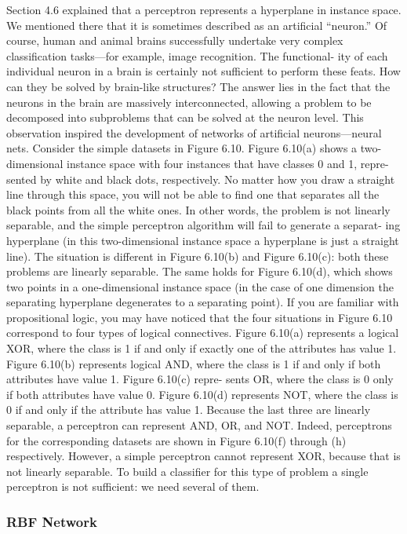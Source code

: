 \documentclass[conference,a4paper]{IEEEtran}
\begin{document}
Section 4.6 explained that a perceptron represents a hyperplane in instance space. We mentioned there that it is sometimes described as an artificial “neuron.” Of course, human and animal brains successfully undertake very complex classification tasks—for example, image recognition. The functional- ity of each individual neuron in a brain is certainly not sufficient to perform these feats. How can they be solved by brain-like structures? The answer lies in the fact that the neurons in the brain are massively interconnected, allowing a problem to be decomposed into subproblems that can be solved at the neuron level. This observation inspired the development of networks of artificial neurons—neural nets.
Consider the simple datasets in Figure 6.10. Figure 6.10(a) shows a two- dimensional instance space with four instances that have classes 0 and 1, repre- sented by white and black dots, respectively. No matter how you draw a straight line through this space, you will not be able to find one that separates all the black points from all the white ones. In other words, the problem is not linearly separable, and the simple perceptron algorithm will fail to generate a separat- ing hyperplane (in this two-dimensional instance space a hyperplane is just a straight line). The situation is different in Figure 6.10(b) and Figure 6.10(c): both these problems are linearly separable. The same holds for Figure 6.10(d), which shows two points in a one-dimensional instance space (in the case of one dimension the separating hyperplane degenerates to a separating point).
If you are familiar with propositional logic, you may have noticed that the four situations in Figure 6.10 correspond to four types of logical connectives. Figure 6.10(a) represents a logical XOR, where the class is 1 if and only if exactly one of the attributes has value 1. Figure 6.10(b) represents logical AND, where the class is 1 if and only if both attributes have value 1. Figure 6.10(c) repre- sents OR, where the class is 0 only if both attributes have value 0. Figure 6.10(d) represents NOT, where the class is 0 if and only if the attribute has value 1. Because the last three are linearly separable, a perceptron can represent AND, OR, and NOT. Indeed, perceptrons for the corresponding datasets are shown in Figure 6.10(f) through (h) respectively. However, a simple perceptron cannot represent XOR, because that is not linearly separable. To build a classifier for this type of problem a single perceptron is not sufficient: we need several of them.

\subsubsection{RBF Network}
\end{document}
